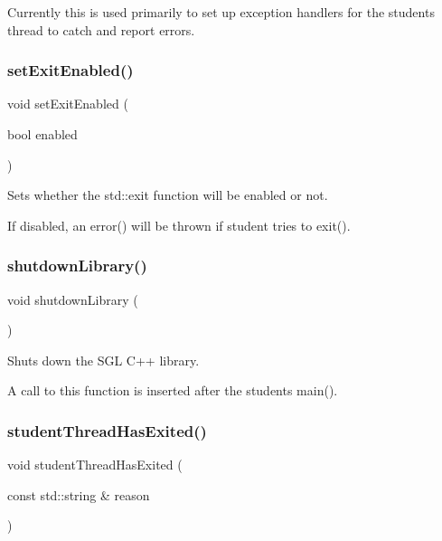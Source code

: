 Currently this is used primarily to set up exception handlers for the student\textquotesingle{}s thread to catch and report errors. \mbox{\label{namespacesgl_afa57f85846177bb4ed2b4b12fa8a758d}} 
\subsubsection{\texorpdfstring{set\+Exit\+Enabled()}{setExitEnabled()}}
{\footnotesize\ttfamily void set\+Exit\+Enabled (\begin{DoxyParamCaption}\item[{bool}]{enabled }\end{DoxyParamCaption})}



Sets whether the std\+::exit function will be enabled or not. 

If disabled, an error() will be thrown if student tries to exit(). \mbox{\label{namespacesgl_a2937cb1c4385064875d0cb29fcdfeae6}} 
\subsubsection{\texorpdfstring{shutdown\+Library()}{shutdownLibrary()}}
{\footnotesize\ttfamily void shutdown\+Library (\begin{DoxyParamCaption}{ }\end{DoxyParamCaption})}



Shuts down the S\+GL C++ library. 

A call to this function is inserted after the student\textquotesingle{}s main(). \mbox{\label{namespacesgl_ad119146bad8508df277e3f629d26284d}} 
\subsubsection{\texorpdfstring{student\+Thread\+Has\+Exited()}{studentThreadHasExited()}}
{\footnotesize\ttfamily void student\+Thread\+Has\+Exited (\begin{DoxyParamCaption}\item[{const std\+::string \&}]{reason }\end{DoxyParamCaption})}

